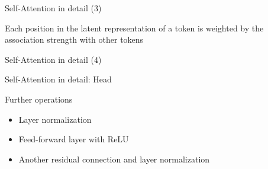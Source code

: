 \documentclass[12pt]{beamer}
\begin{document}
\begin{frame}{Self-Attention in detail (3)}
	
	
	\begin{figure}
		\scalebox{0.75}{\hspace{-2cm}
			
		}
	\end{figure}


	Each position in the latent representation of a token is weighted by the association strength with other tokens
	

\end{frame}


\begin{frame}{Self-Attention in detail (4)}
	
	
	\begin{figure}
		\scalebox{0.75}{\hspace{-2cm}
			
		}
	\end{figure}
	
\end{frame}



\begin{frame}{Self-Attention in detail: Head}
	
	
	\begin{figure}
		\scalebox{0.75}{\hspace{-1.5cm}
			
		}
	\end{figure}
	
	Further operations
	
	\begin{itemize}
		\item Layer normalization
		\item Feed-forward layer with ReLU
		\item Another residual connection and layer normalization
	\end{itemize}
	
\end{frame}
\end{document}
